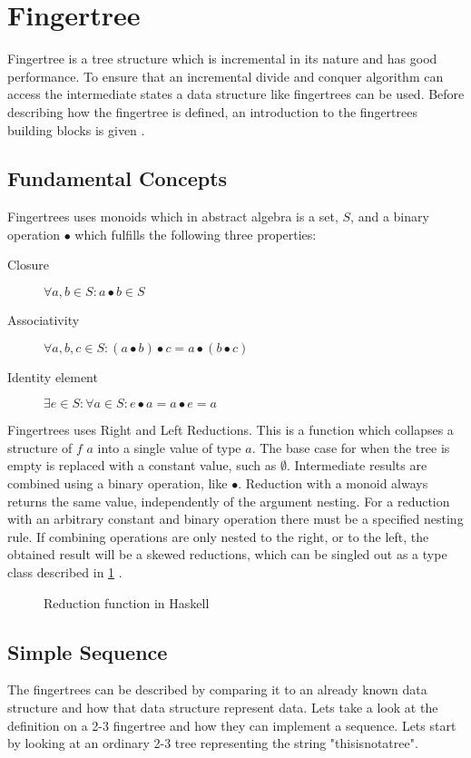 \section{Fingertree}
Fingertree is a tree structure which is incremental in its nature and has good
performance. To ensure that an incremental divide and conquer algorithm can
access the intermediate states a data structure like fingertrees can be used.
Before describing how the fingertree is defined, an introduction to the
fingertrees building blocks is given \cite{fingertree}.

\subsection{Fundamental Concepts}

Fingertrees uses monoids which in abstract algebra is a set, $S$, and a binary
operation $\bullet$ which fulfills the following
three properties:
\begin{description}
\item[Closure] $\forall a,b \in S: a \bullet b \in S$
\item[Associativity] $\forall a,b,c \in S: (a \bullet b) \bullet c = a \bullet
    (b \bullet c)$ 
\item[Identity element] $\exists e \in S: \forall a \in S: e \bullet a = a
    \bullet e = a$
\end{description}

Fingertrees uses Right and Left Reductions. This is a function which
collapses a structure of $f$ $a$ into a single value of type $a$. The base case
for when the tree is empty is replaced with a constant value, such as 
$\emptyset$. Intermediate results are combined using a binary operation, like
$\bullet$. Reduction with a monoid always returns the same value,
independently of the argument nesting. For a reduction with an arbitrary
constant and binary operation there must be a specified nesting rule. If
combining operations are only nested to the right, or to the left, the obtained
result will be a skewed reductions, which can be singled out as a type class
described in \cref{fig:Reduction} \cite{fingertree}.

\begin{figure}[h!]

\caption{Reduction function in Haskell \label{fig:Reduction}}
\end{figure}

\subsection{Simple Sequence}
The fingertrees can be described by comparing it to an already
known data structure and how that data structure represent data. Lets take a look
at the definition on a 2-3 fingertree and how they can implement a sequence.
Lets start by looking at an ordinary 2-3 tree representing the string "thisisnotatree".

